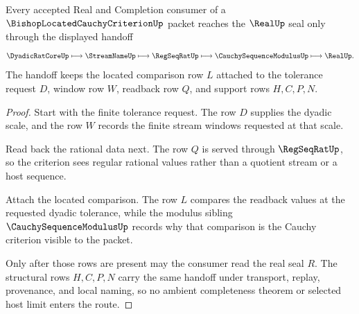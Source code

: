 \begin{theorem}
\label{thm:bishop-located-cauchy-criterion-real-handoff}
Every accepted Real and Completion consumer of a $\BishopLocatedCauchyCriterionUp$ packet reaches the $\RealUp$ seal only through the displayed handoff
$$
\DyadicRatCoreUp \longmapsto
\StreamNameUp \longmapsto
\RegSeqRatUp \longmapsto
\CauchySequenceModulusUp \longmapsto
\RealUp .
$$
The handoff keeps the located comparison row $L$ attached to the tolerance request $D$, window row $W$, readback row $Q$, and support rows $H,C,P,N$.
\end{theorem}
\begin{proof}
Start with the finite tolerance request. The row $D$ supplies the dyadic scale, and the row $W$ records the finite stream windows requested at that scale.

Read back the rational data next. The row $Q$ is served through $\RegSeqRatUp$, so the criterion sees regular rational values rather than a quotient stream or a host sequence.

Attach the located comparison. The row $L$ compares the readback values at the requested dyadic tolerance, while the modulus sibling $\CauchySequenceModulusUp$ records why that comparison is the Cauchy criterion visible to the packet.

Only after those rows are present may the consumer read the real seal $R$. The structural rows $H,C,P,N$ carry the same handoff under transport, replay, provenance, and local naming, so no ambient completeness theorem or selected host limit enters the route.
\end{proof}




